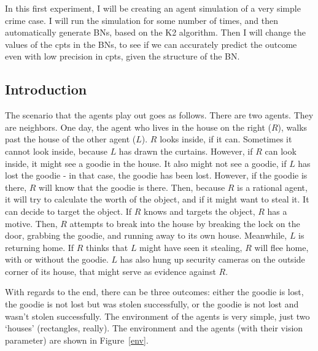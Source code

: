 In this first experiment, I will be creating an agent simulation of a very simple crime case. I will run the simulation for some number of times, and then automatically generate BNs, based on the K2 algorithm. Then I will change the values of the cpts in the BNs, to see if we can accurately predict the outcome even with low precision in cpts, given the structure of the BN.

\subsection{Introduction}

The scenario that the agents play out goes as follows. There are two agents. They are neighbors. One day, the agent who lives in the house on the right ($R$), walks past the house of the other agent ($L$). $R$ looks inside, if it can. Sometimes it cannot look inside, because $L$ has drawn the curtains. However, if $R$ can look inside, it might see a goodie in the house. It also might not see a goodie, if $L$ has lost the goodie - in that case, the goodie has been lost. However, if the goodie is there, $R$ will know that the goodie is there. Then, because $R$ is a rational agent, it will try to calculate the worth of the object, and if it might want to steal it. It can decide to target the object. If $R$ knows and targets the object, $R$ has a motive. Then, $R$ attempts to break into the house by breaking the lock on the door, grabbing the goodie, and running away to its own house.  Meanwhile, $L$ is returning home. If $R$ thinks that $L$ might have seen it stealing, $R$ will flee home, with or without the goodie. $L$ has also hung up security cameras on the outside corner of its house, that might serve as evidence against $R$.

With regards to the end, there can be three outcomes: either the goodie is lost, the goodie is not lost but was stolen successfully, or the goodie is not lost and wasn't stolen successfully. %
The environment of the agents is very simple, just two `houses' (rectangles, really). The environment and the agents (with their vision parameter) are shown in Figure~\ref{env}.

